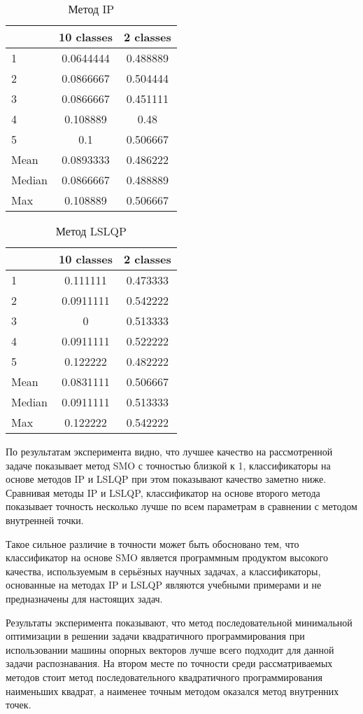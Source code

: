 \begin{table}[H]
    \centering
    \begin{tabular}{|l||c|c|}
        \hline
        & 10 classes & 2 classes \\\hline\hline
        1 & 0.0644444 & 0.488889 \\\hline
        2 & 0.0866667 & 0.504444 \\\hline
        3 & 0.0866667 & 0.451111 \\\hline
        4 & 0.108889 & 0.48 \\\hline
        5 & 0.1 & 0.506667 \\\hline
        Mean & 0.0893333 & 0.486222 \\\hline
        Median & 0.0866667 & 0.488889 \\\hline
        Max & 0.108889 & 0.506667 \\\hline
    \end{tabular}
    \caption{Метод IP}
\end{table}

\begin{table}[H]
    \centering
    \begin{tabular}{|l||c|c|}
        \hline
        & 10 classes & 2 classes \\\hline\hline
        1 & 0.111111 & 0.473333 \\\hline
        2 & 0.0911111 & 0.542222 \\\hline
        3 & 0 & 0.513333 \\\hline
        4 & 0.0911111 & 0.522222 \\\hline
        5 & 0.122222 & 0.482222 \\\hline
        Mean & 0.0831111 & 0.506667 \\\hline
        Median & 0.0911111 & 0.513333 \\\hline
        Max & 0.122222 & 0.542222 \\\hline
    \end{tabular}
    \caption{Метод LSLQP}
\end{table}

По результатам эксперимента видно, что лучшее качество на рассмотренной задаче показывает метод SMO с точностью близкой к 1, классификаторы на основе методов IP и LSLQP при этом показывают качество заметно ниже. Сравнивая методы IP и LSLQP, классификатор на основе второго метода показывает точность несколько лучше по всем параметрам в сравнении с методом внутренней точки.

Такое сильное различие в точности может быть обосновано тем, что классификатор на основе SMO является программным продуктом высокого качества, используемым в серьёзных научных задачах, а классификаторы, основанные на методах IP и LSLQP являются учебными примерами и не предназначены для настоящих задач.

Результаты эксперимента показывают, что метод последовательной минимальной оптимизации в решении задачи квадратичного программирования при использовании машины опорных векторов лучше всего подходит для данной задачи распознавания. На втором месте по точности среди рассматриваемых методов стоит метод последовательного квадратичного программирования наименьших квадрат, а наименее точным методом оказался метод внутренних точек.
